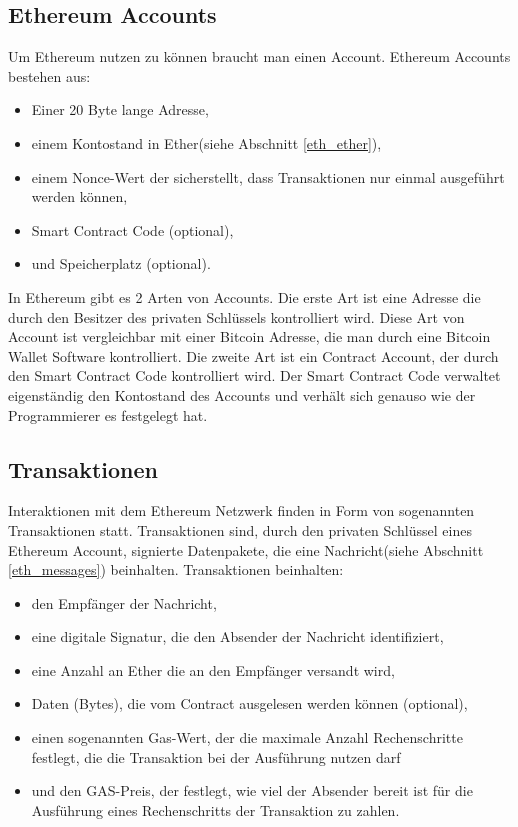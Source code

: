 \subsection{Ethereum Accounts}
Um Ethereum nutzen zu können braucht man einen Account. Ethereum Accounts bestehen aus:\\
\begin{itemize}
\item Einer 20 Byte lange Adresse,
\item einem Kontostand in Ether(siehe Abschnitt \ref{eth_ether}),
\item einem Nonce-Wert der sicherstellt, dass Transaktionen nur einmal ausgeführt werden können,
\item Smart Contract Code (optional),
\item und Speicherplatz (optional).
\end{itemize} In Ethereum gibt es 2 Arten von Accounts. Die erste Art ist eine Adresse die durch den Besitzer des privaten Schlüssels kontrolliert wird. Diese Art von Account ist vergleichbar mit einer Bitcoin Adresse, die man durch eine Bitcoin Wallet Software kontrolliert. Die zweite Art ist ein  Contract Account, der durch den Smart Contract Code kontrolliert wird. Der Smart Contract Code verwaltet eigenständig den Kontostand des Accounts und verhält sich genauso wie der Programmierer es festgelegt hat.

\subsection{Transaktionen}
Interaktionen mit dem Ethereum Netzwerk finden in Form von sogenannten Transaktionen statt. Transaktionen sind, durch den privaten Schlüssel eines Ethereum Account, signierte Datenpakete, die eine Nachricht(siehe Abschnitt \ref{eth_messages}) beinhalten. Transaktionen beinhalten:
\begin{itemize}
\item den Empfänger der Nachricht,
\item eine digitale Signatur, die den Absender der Nachricht identifiziert,
\item eine Anzahl an Ether die an den Empfänger versandt wird,
\item Daten (Bytes), die vom Contract ausgelesen werden können (optional),
\item einen sogenannten Gas-Wert, der die maximale Anzahl Rechenschritte festlegt, die die Transaktion bei der Ausführung nutzen darf
\item und den GAS-Preis, der festlegt, wie viel der Absender bereit ist für die Ausführung eines Rechenschritts der Transaktion zu zahlen.
\end{itemize}

